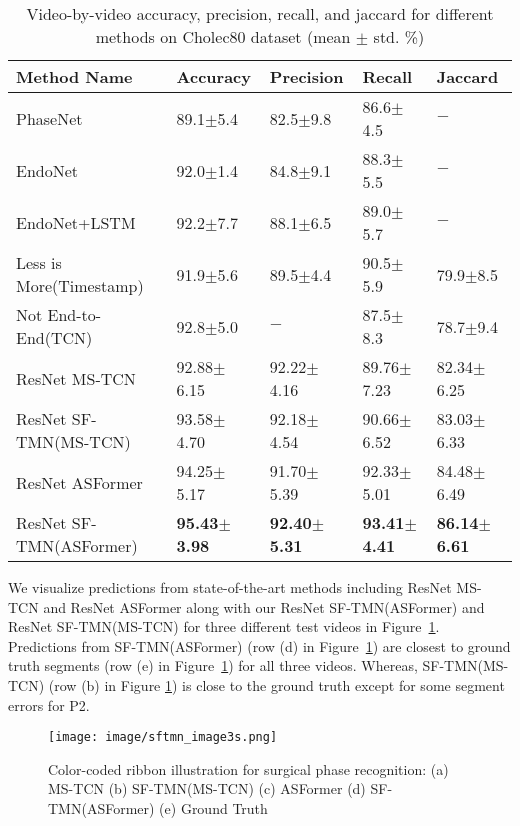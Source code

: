 \documentclass[sn-mathphys,Numbered]{sn-jnl}
\theoremstyle{thmstyleone}\newtheorem{theorem}{Theorem}\newtheorem{proposition}[theorem]{Proposition}
\theoremstyle{thmstyletwo}\newtheorem{example}{Example}\newtheorem{remark}{Remark}
\theoremstyle{thmstylethree}\newtheorem{definition}{Definition}
\begin{document}
\begin{table}[h]
\centering
\caption{Video-by-video accuracy, precision, recall, and jaccard for different methods on Cholec80 dataset (mean $\pm$ std. \%)}\label{tab5}
\begin{tabular}{lllll}
\hline
Method Name &  Accuracy & Precision & Recall & Jaccard\\
\hline

PhaseNet \cite{twinanda2016endonet}& 89.1$\pm$5.4 & 82.5$\pm$9.8 & 86.6$\pm$4.5 & $-$ \\
EndoNet \cite{twinanda2016endonet}& 92.0$\pm$1.4 & 84.8$\pm$9.1 & 88.3$\pm$5.5 & $-$ \\
EndoNet+LSTM \cite{twinanda2017vision}  & 92.2$\pm$7.7 & 88.1$\pm$6.5 & 89.0$\pm$5.7 & $-$ \\
Less is More(Timestamp) \cite{wang2022less} & 91.9$\pm$5.6 & 89.5$\pm$4.4 & 90.5$\pm$5.9 & 79.9$\pm$8.5 \\
Not End-to-End(TCN) \cite{yi2022not} & 92.8$\pm$5.0 & $-$ & 87.5$\pm$8.3 & 78.7$\pm$9.4 \\
\hline
ResNet MS-TCN \cite{farha2019ms}  & 92.88$\pm$6.15 & 92.22$\pm$4.16 & 89.76$\pm$7.23 & 82.34$\pm$6.25\\
ResNet SF-TMN(MS-TCN) & 93.58$\pm$4.70 & 92.18$\pm$4.54 & 90.66$\pm$6.52 & 83.03$\pm$6.33 \\
ResNet ASFormer \cite{yi2021asformer,zhang2022surgicala} & 94.25$\pm$5.17 & 91.70$\pm$5.39 & 92.33$\pm$5.01 & 84.48$\pm$6.49 \\
ResNet SF-TMN(ASFormer) & \textbf{95.43$\pm$3.98} & \textbf{92.40$\pm$5.31} & \textbf{93.41$\pm$4.41} & \textbf{86.14$\pm$6.61} \\

\hline
\end{tabular}
\end{table}

We visualize predictions from state-of-the-art methods including ResNet MS-TCN and ResNet ASFormer along with our ResNet SF-TMN(ASFormer) and ResNet SF-TMN(MS-TCN) for three different test videos in Figure~\ref{fig4}. Predictions from SF-TMN(ASFormer) (row (d) in Figure~\ref{fig4}) are closest to ground truth segments (row (e) in Figure~\ref{fig4}) for all three videos. Whereas, SF-TMN(MS-TCN) (row (b) in Figure \ref{fig4}) is close to the ground truth except for some segment errors for P2.




\begin{figure}[h]\centering
\texttt{[image: image/sftmn\_image3s.png]}
\caption{Color-coded ribbon illustration for surgical
phase recognition: (a) MS-TCN (b) SF-TMN(MS-TCN) (c) ASFormer (d) SF-TMN(ASFormer) (e) Ground Truth}\label{fig4}
\end{figure}
\end{document}
